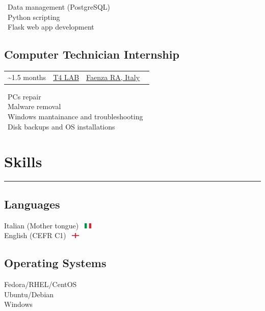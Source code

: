 \documentclass{article}
\newcommand{\event}[3]{
    \begin{tabularx}{\linewidth}{| >{\raggedright\arraybackslash}X >{\centering\arraybackslash}X >{\raggedleft\arraybackslash}X}
        \rowcolor[HTML]{F6F8FA} #1 & #2 & #3
    \end{tabularx}
    \vspace{-10pt}
}
\let\oldsection\section
\renewcommand{\section}[1]{
    \oldsection*{#1}
    \vspace{-20pt}
    \rule{\linewidth}{2pt}
    \vspace{-30pt}
}
\let\oldsubsection\subsection
\renewcommand{\subsection}[1]{
    \oldsubsection*{#1}
    \vspace{-5pt}
}
\begin{document}
\begin{paracol}{2}
    \noindent
    \faDatabase \ Data management (PostgreSQL) \\
    \faPython \ Python scripting \\
    \faFlask \ Flask web app development

    \subsection{Computer Technician Internship}
    \event
        {\faCalendar* 2017 \textasciitilde 1.5 months}
        {\href{https://www.t4lab.it/}{T4 LAB}}
        {\href{https://www.openstreetmap.org/relation/43004}{Faenza RA, Italy} \ \faCity}

    \noindent
    \faLaptop \ PCs repair \\
    \faShieldVirus \ Malware removal \\
    \faRecycle \ Windows mantainance and troubleshooting \\
    \faHdd \ Disk backups and OS installations


    \switchcolumn
    \flushright

    \section{Skills \ \faLightbulb}

    \subsection{Languages}
    Italian (Mother tongue) \ \includegraphics[width=10pt]{it} \\
    English (CEFR C1) \ \includegraphics[width=10pt]{gb-eng}

    \subsection{Operating Systems}
    Fedora/RHEL/CentOS \ \textcolor[HTML]{EE0000}{\faRedhat} \\
    Ubuntu/Debian \ \textcolor[HTML]{E95420}{\faUbuntu} \\
    Windows \ \textcolor[HTML]{0078D6}{\faWindows}


\end{paracol}
\end{document}
